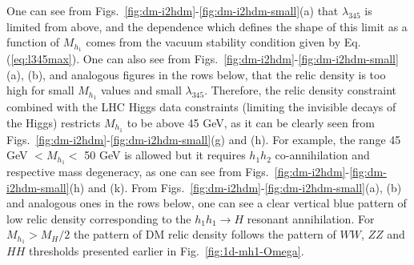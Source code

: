 


One can see from Figs.~\ref{fig:dm-i2hdm}-\ref{fig:dm-i2hdm-small}(a) that $\lambda_{345}$ is limited from above,
and the dependence which defines the  shape of this limit as a function of $M_{h_1}$ comes from 
the vacuum stability condition given by Eq.(\ref{eq:l345max}). One can also see from
Figs.~\ref{fig:dm-i2hdm}-\ref{fig:dm-i2hdm-small}(a), (b), and analogous figures in the rows below, that the relic density
is too high for small $M_{h_1}$ values and small $\lambda_{345}$.
Therefore, the relic density
constraint combined with the LHC Higgs data constraints (limiting the invisible decays of the Higgs) restricts $M_{h_1}$ to be above 45 GeV,
as it can be clearly seen from 
Figs.~\ref{fig:dm-i2hdm}-\ref{fig:dm-i2hdm-small}(g) and (h).
For example, the range 45 GeV $<M_{h_1}<$ 50 GeV is allowed but it requires $h_1h_2$ co-annihilation
and respective mass degeneracy, as one can see from Figs.~\ref{fig:dm-i2hdm}-\ref{fig:dm-i2hdm-small}(h) and (k). From
Figs.~\ref{fig:dm-i2hdm}-\ref{fig:dm-i2hdm-small}(a), (b) and analogous ones in the rows below, one can see a clear vertical blue
pattern of low relic density corresponding to the $h_1 h_1 \to H$ resonant annihilation.  For $M_{h_1}>M_H/2$
the pattern of DM relic density follows the pattern of  $WW$, $ZZ$ and $HH$ thresholds 
presented earlier in Fig.~\ref{fig:1d-mh1-Omega}.

